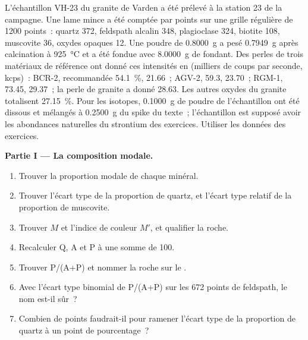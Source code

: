 \begin{problem}\label{pb:b2:field-lab-methods-2:1}
L'échantillon VH-23 du granite de Varden a été prélevé à la station 23 de la campagne. Une lame mince a été
comptée par points sur une grille régulière de 1200 points~: quartz 372, feldspath alcalin 348, plagioclase 324,
biotite 108, muscovite 36, oxydes opaques 12. Une poudre de \qty{0.8000}{g} a pesé \qty{0.7949}{g}
après calcination à \qty{925}{\celsius} et a été fondue avec \qty{8.0000}{g} de fondant. Des perles de trois
matériaux de référence ont donné ces intensités en  (milliers de coups par seconde, kcps)~: BCR-2,
recommandée \qty{54.1}{\percent}, 21.66~; AGV-2, 59.3, 23.70~; RGM-1, 73.45, 29.37~; la perle de granite
a donné 28.63. Les autres oxydes du granite totalisent \qty{27.15}{\percent}. Pour les isotopes,
\qty{0.1000}{g} de poudre de l'échantillon ont été dissous et mélangés à \qty{0.2500}{g} du spike du texte~;
l'échantillon est supposé avoir les abondances naturelles du strontium des exercices. Utiliser les données des
exercices.

\noindent\textbf{Partie I --- La composition modale.}
\begin{enumerate}
  \item Trouver la proportion modale de chaque minéral.
  \item Trouver l'écart type de la proportion de quartz, et l'écart type relatif
        de la proportion de muscovite.
  \item Trouver $M$ et l'indice de couleur $M'$, et qualifier la roche.
  \item Recalculer Q, A et P à une somme de 100.
  \item Trouver P/(A+P) et nommer la roche sur le .
  \item Avec l'écart type binomial de P/(A+P) sur les 672 points de feldspath, le nom est-il
        sûr~?
  \item Combien de points faudrait-il pour ramener l'écart type de la proportion de quartz à un
        point de pourcentage~?
\end{enumerate}


\end{problem}
